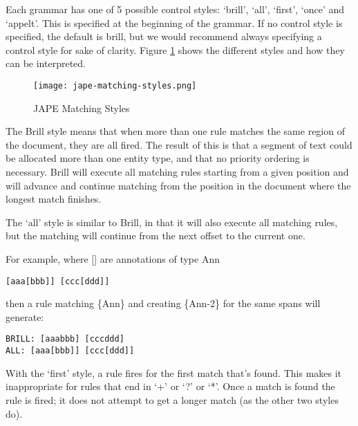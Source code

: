 
Each grammar has one of 5 possible control styles: `brill', `all',
`first', `once' and `appelt'. This is specified at the beginning of the
grammar. If no control style is specified, the default is brill, but we would recommend always specifying a control style for sake of clarity.
Figure \ref{fig:jape:matching-styles} shows the different styles and how they can be interpreted.

\begin{figure}[htb]
\begin{center}
\texttt{[image: jape-matching-styles.png]}
\caption{JAPE Matching Styles}
\label{fig:jape:matching-styles}
\end{center}
\end{figure}

The Brill style means that when more than one rule matches the same region of
the document, they are all fired. The result of this is that a segment of text
could be allocated more than one entity type, and that no priority ordering is
necessary. Brill will execute all matching rules starting from a given position
and will advance and continue matching from the position in the document where
the longest match finishes.

The `all' style is similar to Brill, in that it will also execute all matching
rules, but the matching will continue from the next offset to the current one.

For example, where [] are annotations of type Ann
\begin{small}
\begin{verbatim}
[aaa[bbb]] [ccc[ddd]]
\end{verbatim}
\end{small}
then a rule matching \{Ann\} and creating \{Ann-2\} for the same spans will generate:
\begin{small}
\begin{verbatim}
BRILL: [aaabbb] [cccddd]
ALL: [aaa[bbb]] [ccc[ddd]]
\end{verbatim}
\end{small}

With the `first' style, a rule fires for the first match that's
found. This makes it inappropriate for rules that end in `+' or `?' or
`*'. Once a match is found the rule is fired; it does not attempt to
get a longer match (as the other two styles do).

